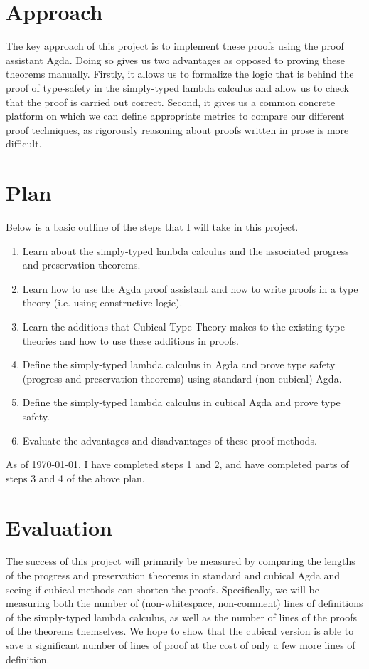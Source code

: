 \documentclass[10pt, letterpaper]{article}
\begin{document}
\section{Approach}
\begin{flushleft}
The key approach of this project is to implement these proofs using the proof assistant Agda. Doing so gives us two advantages as opposed to proving these theorems manually. Firstly, it allows us to formalize the logic that is behind the proof of type-safety in the simply-typed lambda calculus and allow us to check that the proof is carried out correct. Second, it gives us a common concrete platform on which we can define appropriate metrics to compare our different proof techniques, as rigorously reasoning about proofs written in prose is more difficult.
\end{flushleft}

\section{Plan}
\begin{flushleft}
Below is a basic outline of the steps that I will take in this project.
\begin{enumerate}[1.]
	\item Learn about the simply-typed lambda calculus and the associated progress and preservation theorems.
	\item Learn how to use the Agda proof assistant and how to write proofs in a type theory (i.e. using constructive logic).
	\item Learn the additions that Cubical Type Theory makes to the existing type theories and how to use these additions in proofs.
	\item Define the simply-typed lambda calculus in Agda and prove type safety (progress and preservation theorems) using standard (non-cubical) Agda.
	\item Define the simply-typed lambda calculus in cubical Agda and prove type safety.
	\item Evaluate the advantages and disadvantages of these proof methods.
\end{enumerate}
As of \today, I have completed steps 1 and 2, and have completed parts of steps 3 and 4 of the above plan. 
\end{flushleft}

\section{Evaluation}
\begin{flushleft}
The success of this project will primarily be measured by comparing the lengths of the progress and preservation theorems in standard and cubical Agda and seeing if cubical methods can shorten the proofs. Specifically, we will be measuring both the number of (non-whitespace, non-comment) lines of definitions of the simply-typed lambda calculus, as well as the number of lines of the proofs of the theorems themselves. We hope to show that the cubical version is able to save a significant number of lines of proof at the cost of only a few more lines of definition.
\end{flushleft}



\end{document}
